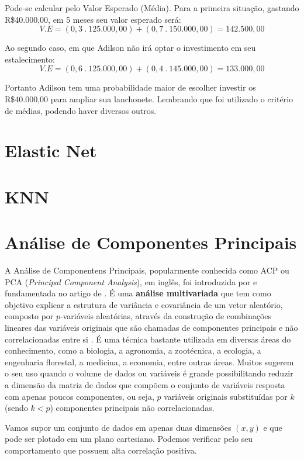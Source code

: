 \documentclass[
]{book}
\begin{document}
Pode-se calcular pelo Valor Esperado (Média). Para a primeira situação, gastando R\$40.000,00, em 5 meses seu valor esperado será:
\[V.E=(0,3\ .\ 125.000,00)+(0,7\ . \ 150.000,00)= 142.500,00\]

Ao segundo caso, em que Adilson não irá optar o investimento em seu estalecimento:
\[V.E=(0,6\ .\ 125.000,00)+(0,4\ . \ 145.000,00)= 133.000,00\]

Portanto Adilson tem uma probabilidade maior de escolher investir os R\$40.000,00 para ampliar sua lanchonete. Lembrando que foi utilizado o critério de médias, podendo haver diversos outros.

\hypertarget{elastic-net}{%
\section{Elastic Net}\label{elastic-net}}

\hypertarget{knn}{%
\section{KNN}\label{knn}}

\hypertarget{AC}{%
\section{Análise de Componentes Principais}\label{AC}}

A Análise de Componentens Principais, popularmente conhecida como ACP ou PCA (\emph{Principal Component Analysis}), em inglês, foi introduzida por \citet{pearson1901liii} e fundamentada no artigo de \citet{hotelling1933analysis}. É uma \textbf{análise multivariada} que tem como objetivo explicar a estrutura de variância e covariância de um vetor aleatório, composto por \(p\)-variáveis aleatórias, através da construção de combinações lineares das variáveis originais que são chamadas de componentes principais e não correlacionadas entre si \citep{mingoti2007analise}. É uma técnica bastante utilizada em diversas áreas do conhecimento, como a biologia, a agronomia, a zootécnica, a ecologia, a engenharia florestal, a medicina, a economia, entre outras áreas. Muitos sugerem o seu uso quando o volume de dados ou variáveis é grande possibilitando reduzir a dimensão da matriz de dados que compõem o conjunto de variáveis resposta com apenas poucos componentes, ou seja, \(p\) variáveis originais substituídas por \(k\) (sendo \(k < p\)) componentes principais não correlacionadas.

Vamos supor um conjunto de dados em apenas duas dimensões \((x, y)\) e que pode ser plotado em um plano cartesiano. Podemos verificar pelo seu comportamento que possuem alta correlação positiva.
\end{document}
